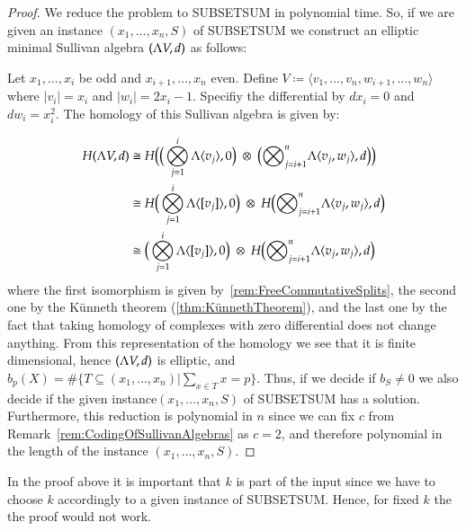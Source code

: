  \begin{proof}
  We reduce the problem to SUBSETSUM in polynomial time.
  So, if we are given an instance $(x_1, \ldots, x_n, S)$ of SUBSETSUM we construct an elliptic minimal Sullivan
  algebra $(\Lambda V,d)$ as follows: 
  
  Let $x_1, \ldots, x_i$ be odd and $x_{i+1}, \ldots, x_n$ even. Define 
  $V \coloneqq \langle v_1, \ldots, v_n, w_{i+1}, \ldots , w_n \rangle$ where $|v_i| = x_i$ and $|w_i| = 2x_i -1$.
  Specifiy the differential by $dx_i = 0$ and $dw_i = x_i^2$. The homology of this Sullivan algebra is given by:
   
  \begin{align*}
  H (\Lambda V,d) &\cong H \big{(} \big{(}\bigotimes_{j = 1}^i \Lambda \langle v_j \rangle , 0 \big{)} \;\otimes \;  
  \big{(} {\bigotimes}_{j=i + 1}^n \Lambda \langle v_{j} ,w_{j}\rangle , d \big{)} \big{)}  \\
  &\cong H\big{(} \bigotimes_{j = 1}^i \Lambda \langle [v_j] \rangle , 0 \big{)}
  \; \otimes \;H \big{(}  {\bigotimes}_{j=i + 1}^n \Lambda \langle v_{j} ,w_{j}\rangle  , d\big{)} \\ 
  &\cong \big{(} \bigotimes_{j = 1}^i \Lambda \langle [v_j] \rangle , 0 \big{)}
  \; \otimes \;H \big{(}  {\bigotimes}_{j=i + 1}^n \Lambda \langle v_{j} ,w_{j}\rangle  , d\big{)}
  \end{align*}
  where the first isomorphism is given by~\ref{rem:FreeCommutativeSplits}, the second one by the Künneth theorem
  (\ref{thm:KünnethTheorem}),
  and the last one by the fact that taking homology of complexes with zero differential does not change anything.
  From this representation of the homology
  we see that it is finite dimensional, hence $(\Lambda V,d)$ is elliptic, and 
  ${b_p(X) = \# {\lbrace T \subseteq (x_1, \ldots, x_n) | \sum_{x \in T} x = p \rbrace}}$.
  Thus, if we decide if $b_S \neq 0$ we also decide if the given instance$(x_1, \ldots, x_n, S)$ of SUBSETSUM
  has a solution. Furthermore, this reduction is polynomial in $n$ 
  since we can fix $c$ from Remark~\ref{rem:CodingOfSullivanAlgebras} as $c = 2$,
  and therefore polynomial in the length of the instance $(x_1, \ldots, x_n, S)$. 
 \end{proof}

 \begin{Remark}
  In the proof above it is important that $k$ is part of the input since we have to choose $k$ accordingly
  to a given instance of SUBSETSUM. Hence, for fixed $k$ the the proof would not work.
 \end{Remark}

